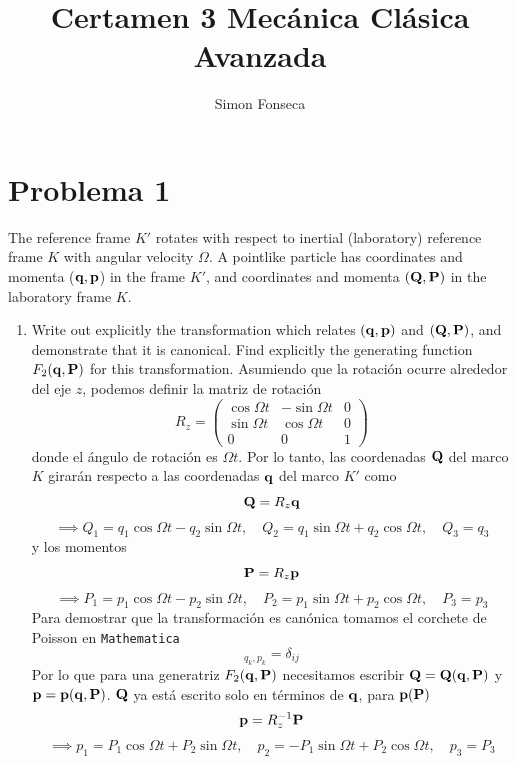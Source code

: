 \documentclass[]{article}
\title{Certamen 3 Mecánica Clásica Avanzada}
\author{Simon Fonseca}
\numberwithin{equation}{section}
\begin{document}
\maketitle
\section{Problema 1}
The reference frame $K'$ rotates with respect to inertial (laboratory) reference frame $K$ with angular velocity $\Omega$. A pointlike particle has coordinates and momenta ($\mathbf{q},\mathbf{p}$) in the frame $K'$, and coordinates and momenta $(\mathbf{Q},\mathbf{P})$ in the laboratory frame $K$.
\begin{enumerate}
	\item[(a)] Write out explicitly the transformation which relates $(\mathbf{q}, \mathbf{p})$ and $(\mathbf{Q}, \mathbf{P} )$, and demonstrate that it is canonical. Find explicitly the generating function $F_2(\mathbf{q}, \mathbf{P} )$ for this transformation.
	\resp Asumiendo que la rotación ocurre alrededor del eje $z$, podemos definir la matriz de rotación
	\begin{equation}
		R_z = \begin{pmatrix}
			\cos \Omega t & -\sin \Omega t & 0 \\
			\sin \Omega t &  \cos \Omega t & 0 \\
			0 & 0 & 1
		\end{pmatrix}
	\end{equation}
	donde el ángulo de rotación es $\Omega t$. Por lo tanto, las coordenadas $\mathbf{Q}$ del marco $K$ girarán respecto a las coordenadas $\mathbf{q}$ del marco $K'$ como
	\begin{equation}
		\mathbf{Q} = R_z \mathbf{q}
	\end{equation}
	\begin{equation}
		\implies Q_1 = q_1 \cos \Omega t - q_2 \sin \Omega t, \quad Q_2 = q_1 \sin \Omega t + q_2 \cos \Omega t, \quad Q_3 = q_3
	\end{equation}
	y los momentos
	\begin{equation}
		\mathbf{P} = R_z \mathbf{p}
	\end{equation}
	\begin{equation}
		\implies P_1 =p_1 \cos \Omega t - p_2 \sin \Omega t, \quad P_2 = p_1 \sin \Omega t + p_2 \cos \Omega t, \quad P_3 = p_3
	\end{equation}
	Para demostrar que la transformación es canónica tomamos el corchete de Poisson en \texttt{Mathematica}
	\begin{equation}
		[Q_i,P_j]_{q_k,p_k} = \delta_{ij}
	\end{equation}
	Por lo que para una generatriz $F_2(\mathbf{q},\mathbf{P})$ necesitamos escribir $\mathbf{Q} = \mathbf{Q}(\mathbf{q},\mathbf{P})$ y $\mathbf{p} = \mathbf{p}(\mathbf{q},\mathbf{P})$. $\mathbf{Q}$ ya está escrito solo en términos de $\mathbf{q}$, para $\mathbf{p}(\mathbf{P})$
	\begin{equation}
		\mathbf{p} = R_z^{-1} \mathbf{P}
	\end{equation}
	\begin{equation}
		\implies p_1 = P_1 \cos \Omega t + P_2 \sin \Omega t, \quad p_2 = - P_1 \sin \Omega t + P_2 \cos \Omega t, \quad p_3 = P_3
	\end{equation}
	

\end{enumerate}
\end{document}
